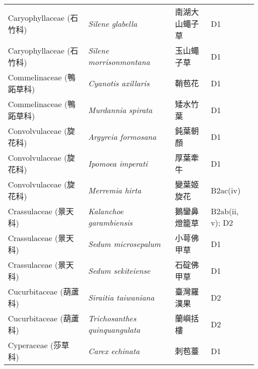 \begin{longtable}{p{3cm}p{5cm}p{3cm}p{4cm}}
    Caryophyllaceae (石竹科) & \textit{Silene glabella}  & 南湖大山蠅子草 & D1 \index{Silene@\textit{Silene}!glabella@\textit{glabella}}  \index{南湖大山蠅子草} \\
    Caryophyllaceae (石竹科) & \textit{Silene morrisonmontana}  & 玉山蠅子草 & D1 \index{Silene@\textit{Silene}!morrisonmontana@\textit{morrisonmontana}}  \index{玉山蠅子草} \\
    Commelinaceae (鴨跖草科) & \textit{Cyanotis axillaris}  & 鞘苞花 & D1 \index{Cyanotis@\textit{Cyanotis}!axillaris@\textit{axillaris}}  \index{鞘苞花} \\
    Commelinaceae (鴨跖草科) & \textit{Murdannia spirata}  & 矮水竹葉 & D1 \index{Murdannia@\textit{Murdannia}!spirata@\textit{spirata}}  \index{矮水竹葉} \\
    Convolvulaceae (旋花科) & \textit{Argyreia formosana}  & 鈍葉朝顏 & D1 \index{Argyreia@\textit{Argyreia}!formosana@\textit{formosana}}  \index{鈍葉朝顏} \\
    Convolvulaceae (旋花科) & \textit{Ipomoea imperati}  & 厚葉牽牛 & D1 \index{Ipomoea@\textit{Ipomoea}!imperati@\textit{imperati}}  \index{厚葉牽牛} \\
    Convolvulaceae (旋花科) & \textit{Merremia hirta}  & 變葉姬旋花 & B2ac(iv) \index{Merremia@\textit{Merremia}!hirta@\textit{hirta}}  \index{變葉姬旋花} \\
    Crassulaceae (景天科) & \textit{Kalanchoe garambiensis}  & 鵝鑾鼻燈籠草 & B2ab(ii, v); D2 \index{Kalanchoe@\textit{Kalanchoe}!garambiensis@\textit{garambiensis}}  \index{鵝鑾鼻燈籠草} \\
    Crassulaceae (景天科) & \textit{Sedum microsepalum}  & 小萼佛甲草 & D1 \index{Sedum@\textit{Sedum}!microsepalum@\textit{microsepalum}}  \index{小萼佛甲草} \\
    Crassulaceae (景天科) & \textit{Sedum sekiteiense}  & 石碇佛甲草 & D1 \index{Sedum@\textit{Sedum}!sekiteiense@\textit{sekiteiense}}  \index{石碇佛甲草} \\
    Cucurbitaceae (葫蘆科) & \textit{Siraitia taiwaniana}  & 臺灣羅漢果 & D2 \index{Siraitia@\textit{Siraitia}!taiwaniana@\textit{taiwaniana}}  \index{臺灣羅漢果} \\
    Cucurbitaceae (葫蘆科) & \textit{Trichosanthes quinquangulata}  & 蘭嶼括樓 & D2 \index{Trichosanthes@\textit{Trichosanthes}!quinquangulata@\textit{quinquangulata}}  \index{蘭嶼括樓} \\
    Cyperaceae (莎草科) & \textit{Carex echinata}  & 刺苞薹 & D1 \index{Carex@\textit{Carex}!echinata@\textit{echinata}}  \index{刺苞薹} \\

\end{longtable}
